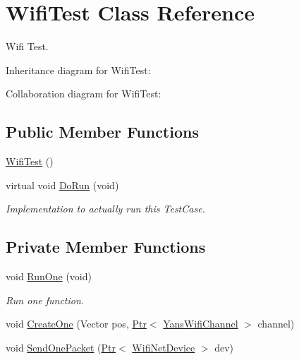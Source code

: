 \hypertarget{classWifiTest}{}\section{Wifi\+Test Class Reference}
\label{classWifiTest}


Wifi Test.  




Inheritance diagram for Wifi\+Test\+:


Collaboration diagram for Wifi\+Test\+:
\subsection*{Public Member Functions}
\begin{DoxyCompactItemize}
\item 
\hyperlink{classWifiTest_a32fb0546009042fb1c6bb16f0eb093f1}{Wifi\+Test} ()
\item 
virtual void \hyperlink{classWifiTest_ae54d485b655adb7c86cde1cd79f6c5c0}{Do\+Run} (void)
\begin{DoxyCompactList}\small\item\em Implementation to actually run this Test\+Case. \end{DoxyCompactList}\end{DoxyCompactItemize}
\subsection*{Private Member Functions}
\begin{DoxyCompactItemize}
\item 
void \hyperlink{classWifiTest_a63a3849e54df5628422bbb6260de403a}{Run\+One} (void)
\begin{DoxyCompactList}\small\item\em Run one function. \end{DoxyCompactList}\item 
void \hyperlink{classWifiTest_a212be82b387f5446375a45ccbac3561e}{Create\+One} (Vector pos, \hyperlink{classns3_1_1Ptr}{Ptr}$<$ \hyperlink{classns3_1_1YansWifiChannel}{Yans\+Wifi\+Channel} $>$ channel)
\item 
void \hyperlink{classWifiTest_ab8396decc55a92bc2fe63e02350812a1}{Send\+One\+Packet} (\hyperlink{classns3_1_1Ptr}{Ptr}$<$ \hyperlink{classns3_1_1WifiNetDevice}{Wifi\+Net\+Device} $>$ dev)
\end{DoxyCompactItemize}

